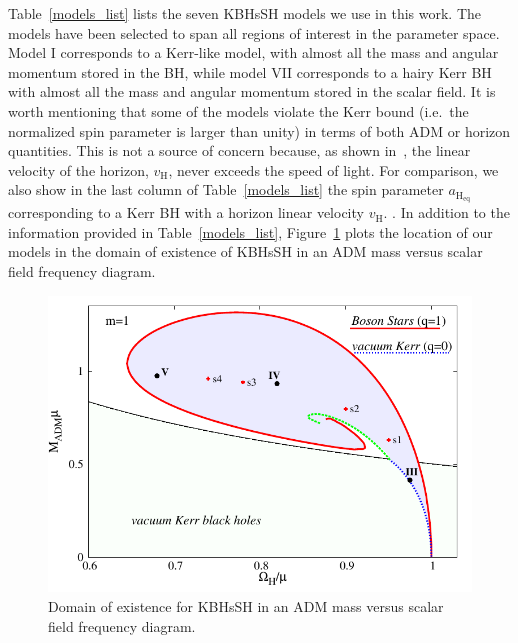 \documentclass[twocolumn,aps,showpacs,showkeys,prd,superscriptaddress,byrevtex, amsmath]{revtex4-1}
\begin{document}
Table~\ref{models_list} lists the seven KBHsSH models we use in this work. The models have been selected to span all regions of interest in the parameter space. Model I corresponds to a Kerr-like model, with almost all the mass and angular momentum stored in the BH, while model VII corresponds to a hairy Kerr BH with almost all the mass and angular momentum stored in the scalar field. It is worth mentioning that some of the models violate the Kerr bound (i.e.~the normalized spin parameter is larger than unity) in terms of both ADM or horizon quantities. This is not a source of concern because, as shown in~\cite{Herdeiro:2015c}, the linear velocity of the horizon, $v_{\mathrm{H}}$, never exceeds the speed of light. For comparison, we also show in the last column of Table~\ref{models_list} the spin parameter $a_{\mathrm{H_{eq}}}$ corresponding to a Kerr BH with a horizon linear velocity $v_{\mathrm{H}}$. . In addition to the information provided in Table~\ref{models_list}, Figure~\ref{existence} plots the location of our models in  the domain of existence of KBHsSH in an ADM mass versus scalar field frequency diagram.  


\begin{figure}
\centering
\includegraphics[scale=0.7]{figures/existence-eps-converted-to.pdf}
\caption{Domain of existence for KBHsSH in an ADM mass versus scalar
field frequency diagram. }
\label{existence}
\end{figure}
\end{document}
